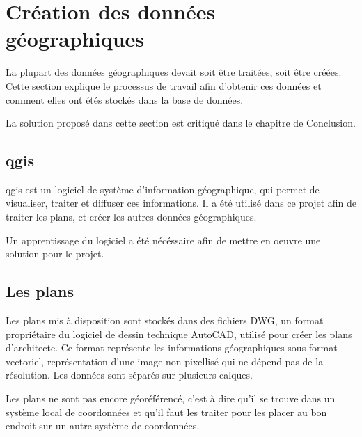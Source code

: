 \documentclass[
    iai, %
    il, %
]{heig-tb}
\begin{document}
\section{Création des données géographiques}

La plupart des données géographiques devait soit être traitées, soit être créées.
Cette section explique le processus de travail afin d'obtenir ces données et comment elles ont étés stockés dans la base de données.

La solution proposé dans cette section est critiqué dans le chapitre de Conclusion.

\subsection{\gls{qgis}}
\gls{qgis} est un logiciel de système d'information géographique, qui permet de visualiser, traiter et diffuser ces informations.
Il a été utilisé dans ce projet afin de traiter les plans, et créer les autres données géographiques.

Un apprentissage du logiciel a été nécéssaire afin de mettre en oeuvre une solution pour le projet.

\subsection{Les plans}
Les plans mis à disposition sont stockés dans des fichiers DWG, un format propriétaire du logiciel de dessin technique AutoCAD, utilisé pour créer les plans d'architecte.
Ce format représente les informations géographiques sous format vectoriel, représentation d'une image non pixellisé qui ne dépend pas de la résolution.
Les données sont séparés sur plusieurs calques.

Les plans ne sont pas encore géoréférencé, c'est à dire qu'il se trouve dans un système local de coordonnées
et qu'il faut les traiter pour les placer au bon endroit sur un autre système de coordonnées.
\end{document}
